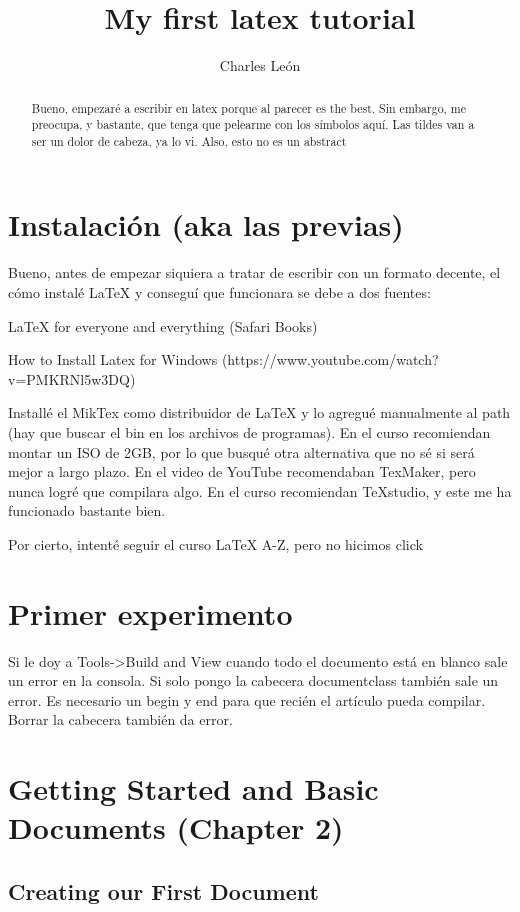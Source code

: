 \documentclass{article}
\title{My first latex tutorial}
\author{Charles León}
\begin{document}
	\maketitle
	\begin{abstract}
		Bueno, empezaré a escribir en latex porque al parecer es the best.
		Sin embargo, me preocupa, y bastante, que tenga que pelearme con los símbolos aquí. Las tildes van a ser un dolor de cabeza, ya lo vi. Also, esto no es un abstract
	\end{abstract}

	
	\section{Instalación (aka las previas)}
		
	Bueno, antes de empezar siquiera a tratar de escribir con un formato decente, el cómo instalé LaTeX y conseguí que funcionara se debe a dos fuentes:
	
		LaTeX for everyone and everything (Safari Books)
		
		How to Install Latex for Windows (https://www.youtube.com/watch?v=PMKRNl5w3DQ)
	
	Installé el MikTex como distribuidor de LaTeX y lo agregué manualmente al path (hay que buscar el bin en los archivos de programas). En el curso recomiendan montar un ISO de 2GB, por lo que busqué otra alternativa que no sé si será mejor a largo plazo. En el video de YouTube recomendaban TexMaker, pero nunca logré que compilara algo. En el curso recomiendan TeXstudio, y este me ha funcionado bastante bien.
	
	Por cierto, intenté seguir el curso LaTeX A-Z, pero no hicimos click
	
	\section{Primer experimento}
	
	Si le doy a Tools->Build and View cuando todo el documento está en blanco sale un error en la consola. Si solo pongo la cabecera documentclass también sale un error. Es necesario un begin y end para que recién el artículo pueda compilar. Borrar la cabecera también da error.
	
	\section{Getting Started and Basic Documents (Chapter 2)}
	
	\subsection{Creating our First Document}
	
\end{document}
